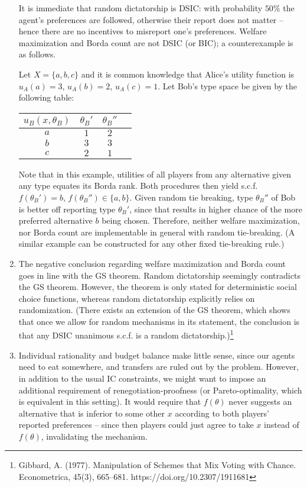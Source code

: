 \documentclass[a4paper]{article}
\begin{document}
\begin{enumerate}
		It is immediate that random dictatorship is DSIC: with probability $50\%$ the agent's preferences are followed, otherwise their report does not matter -- hence there are no incentives to misreport one's preferences. Welfare maximization and Borda count are not DSIC (or BIC); a counterexample is as follows. 
		
		Let $X = \{a,b,c\}$ and it is common knowledge that Alice's utility function is $u_A(a)=3$, $u_A(b)=2$, $u_A(c)=1$. Let Bob's type space be given by the following table:
		\begin{center}
			\begin{tabular}{c | c c c}
				$u_B(x,\theta_B)$ & $\theta_B'$ & $\theta_B''$
				\\ \hline
				$a$ & $1$ & $2$
				\\
				$b$ & $3$ & $3$
				\\
				$c$ & $2$ & $1$
			\end{tabular}
		\end{center}
		Note that in this example, utilities of all players from any alternative given any type equates its Borda rank.
		Both procedures then yield s.c.f. $f(\theta_B') = b$, $f(\theta_B'') \in \{a,b\}$. Given random tie breaking, type $\theta_B''$ of Bob is better off reporting type $\theta_B'$, since that results in higher chance of the more preferred alternative $b$ being chosen. Therefore, neither welfare maximization, nor Borda count are implementable in general with random tie-breaking. (A similar example can be constructed for any other fixed tie-breaking rule.)
		
		\item The negative conclusion regarding welfare maximization and Borda count goes in line with the GS theorem. Random dictatorship seemingly contradicts the GS theorem. However, the theorem is only stated for deterministic social choice functions, whereas random dictatorship explicitly relies on randomization. (There exists an extension of the GS theorem, which shows that once we allow for random mechanisms in its statement, the conclusion is that any DSIC unanimous s.c.f. is a random dictatorship.)\footnote{Gibbard, A. (1977). Manipulation of Schemes that Mix Voting with Chance. Econometrica, 45(3), 665–681. https://doi.org/10.2307/1911681}
		
		\item Individual rationality and budget balance make little sense, since our agents need to eat somewhere, and transfers are ruled out by the problem. However, in addition to the usual IC constraints, we might want to impose an additional requirement of renegotiation-proofness (or Pareto-optimality, which is equivalent in this setting). It would require that $f(\theta)$ never suggests an alternative that is inferior to some other $x$ according to both players' reported preferences -- since then players could just agree to take $x$ instead of $f(\theta)$, invalidating the mechanism.
	\end{enumerate}
\fi
\end{document}
